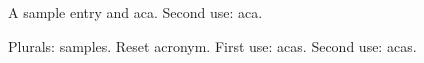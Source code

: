\documentclass{article}
\begin{document}
A \gls{sample} entry and \gls{aca}. Second use: \gls{aca}.

Plurals: \glspl{sample}. Reset acronym.
First use: \glspl{aca}. Second use: \glspl{aca}.

\printglossaries
\end{document}
